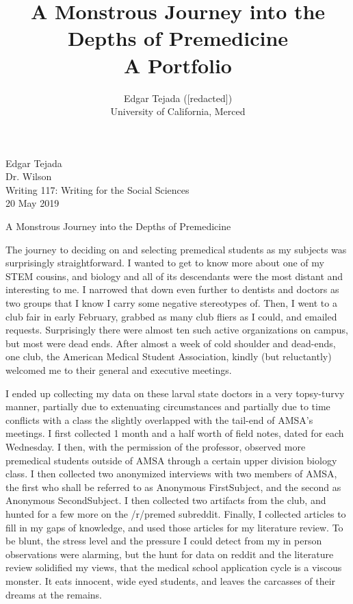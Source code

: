 \documentclass [12pt]{article}
\title{A Monstrous Journey into the Depths of Premedicine\\\medskip A Portfolio}
\author{Edgar Tejada ([redacted])\\University of California, Merced}
\begin{document}
\begin{flushleft}
Edgar Tejada\\
Dr. Wilson\\
Writing 117: Writing for the Social Sciences\\
20 May 2019\\


\begin{center}
	A Monstrous Journey into the Depths of Premedicine\\
\end{center}


\setlength{\parindent}{0.5in}
The journey to deciding on and selecting premedical students as my subjects was surprisingly straightforward. I wanted to get to know more about one of my STEM cousins, and biology and all of its descendants were the most distant and interesting to me. I narrowed that down even further to dentists and doctors as two groups that I know I carry some negative stereotypes of. Then, I went to a club fair in early February, grabbed as many club fliers as I could, and emailed requests. Surprisingly there were almost ten such active organizations on campus, but most were dead ends.
After almost a week of cold shoulder and dead-ends, one club, the American Medical Student Association, kindly (but reluctantly) welcomed me to their general and executive meetings.

I ended up collecting my data on these larval state doctors in a very topsy-turvy manner, partially due to extenuating circumstances and partially due to time conflicts with a class the slightly overlapped with the tail-end of AMSA's meetings. I first collected 1 month and a half worth of field notes, dated for each Wednesday. I then, with the permission of the professor, observed more premedical students outside of AMSA through a certain upper division biology class. I then collected two anonymized interviews with two members of AMSA, the first who shall be referred to as Anonymous FirstSubject, and the second as Anonymous SecondSubject. I then collected two artifacts from the club, and hunted for a few more on the /r/premed subreddit. Finally, I collected articles to fill in my gaps of knowledge, and used those articles for my literature review. To be blunt, the stress level and the pressure I could detect from my in person observations were alarming, but the hunt for data on reddit and the literature review solidified my views, that the medical school application cycle is a viscous monster. It eats innocent, wide eyed students, and leaves the carcasses of their dreams at the remains.



\newpage
\medskip %
\nocite{*} %
\printbibliography%

\end{flushleft}
\end{document}
